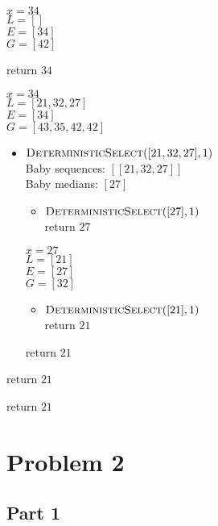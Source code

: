 \documentclass{article}
\begin{document}
\begin{itemize}
\begin{itemize}
\begin{itemize}
            $x = 34$ \\
            $L = []$ \\
            $E = [34]$ \\
            $G = [42]$
            
            return $34$
        \end{itemize}

        $x = 34$ \\
        $L = [21, 32, 27]$ \\
        $E = [34]$ \\
        $G = [43, 35, 42, 42]$

        \begin{itemize}
            \item $\textproc{DeterministicSelect}([21, 32, 27],1)$ \\
            Baby sequences: $[[21, 32, 27]]$ \\
            Baby medians: $[27]$
            \begin{itemize}
                \item $\textproc{DeterministicSelect}([27],1)$ \\
                return $27$
            \end{itemize}

            $x = 27$ \\
            $L = [21]$ \\
            $E = [27]$ \\
            $G = [32]$

            \begin{itemize}
                \item $\textproc{DeterministicSelect}([21], 1)$ \\
                return $21$
            \end{itemize}
            return $21$           
        \end{itemize}
        
        return $21$
    \end{itemize}

    return $21$
\end{itemize}


\section{Problem 2}

\subsection{Part 1}
\end{document}
